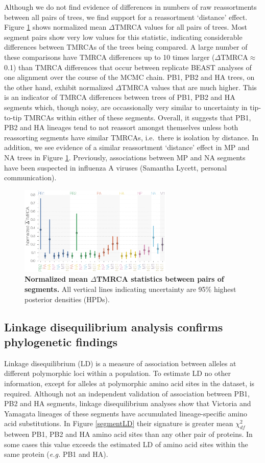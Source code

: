 \documentclass[11pt,oneside,letterpaper]{article}
\begin{document}
Although we do not find evidence of differences in numbers of raw reassortments between all pairs of trees, we find support for a reassortment `distance' effect.
Figure \ref{deltaTMRCA} shows normalized mean $\Delta$TMRCA values for all pairs of trees.
Most segment pairs show very low values for this statistic, indicating considerable differences between TMRCAs of the trees being compared.
A large number of these comparisons have TMRCA differences up to 10 times larger ($\Delta$TMRCA$\approx$0.1) than TMRCA differences that occur between replicate BEAST analyses of one alignment over the course of the MCMC chain.
PB1, PB2 and HA trees, on the other hand, exhibit normalized $\Delta$TMRCA values that are much higher.
This is an indicator of TMRCA differences between trees of PB1, PB2 and HA segments which, though noisy, are occassionally very similar to uncertainty in tip-to-tip TMRCAs within either of these segments.
Overall, it suggests that PB1, PB2 and HA lineages tend to not reassort amongst themselves unless both reassorting segments have similar TMRCAs, i.e.\ there is isolation by distance.
In addition, we see evidence of a similar reassortment `distance' effect in MP and NA trees in Figure \ref{deltaTMRCA}.
Previously, associations between MP and NA segments have been suspected in influenza A viruses (Samantha Lycett, personal communication).

\begin{figure}[h]
	\centering		
	\includegraphics[width=0.65\textwidth]{figures/InfB_normalizedMuDeltaTMRCA.png}
	\caption{\textbf{Normalized mean $\Delta$TMRCA statistics between pairs of segments.}
All vertical lines indicating uncertainty are 95\% highest posterior densities (HPDs).}
	\label{deltaTMRCA}
\end{figure}

\subsection*{Linkage disequilibrium analysis confirms phylogenetic findings}
Linkage disequilibrium (LD) is a measure of association between alleles at different polymorphic loci within a population.
To estimate LD no other information, except for alleles at polymorphic amino acid sites in the dataset, is required.
Although not an independent validation of association between PB1, PB2 and HA segments, linkage disequilibrium analyses show that Victoria and Yamagata lineages of these segments have accumulated lineage-specific amino acid substitutions.
In Figure \ref{segmentLD} their signature is greater mean $\chi^{2}_{df}$ between PB1, PB2 and HA amino acid sites than any other pair of proteins.
In some cases this value exceeds the estimated LD of amino acid sites within the same protein (\textit{e.g.} PB1 and HA).
\end{document}
